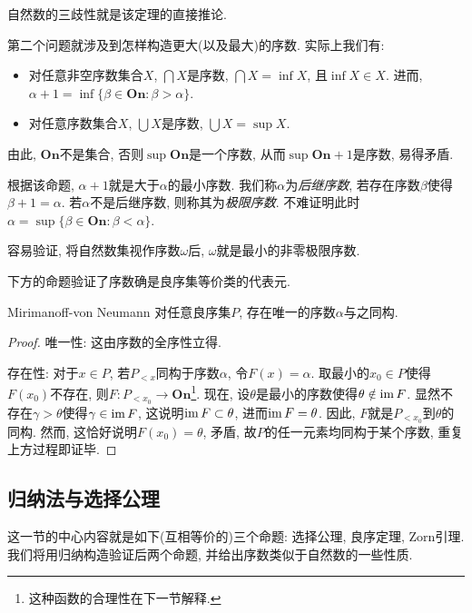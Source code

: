 自然数的三歧性就是该定理的直接推论. 

第二个问题就涉及到怎样构造更大(以及最大)的序数. 实际上我们有: 

\begin{proposition}{}
	\vspace{-2em}
	\begin{itemize}
		\item 对任意非空序数集合$X$, $\bigcap X$是序数, $\bigcap X = \inf X$, 且$\inf X \in X$. 进而, $\alpha +1 = \inf \{ \beta \in \mathbf{On} : \beta > \alpha \}$. 
		\item 对任意序数集合$X$, $\bigcup X$是序数, $\bigcup X = \sup X$. 
	\end{itemize}
\end{proposition}

由此, $\mathbf{On}$不是集合, 否则$\sup \mathbf{On}$是一个序数, 从而$\sup \mathbf{On} + 1$是序数, 易得矛盾. 

根据该命题, $\alpha +1$就是大于$\alpha$的最小序数. 我们称$\alpha$为\textit{后继序数}, 若存在序数$\beta$使得$\beta +1 =\alpha$. 若$\alpha$不是后继序数, 则称其为\textit{极限序数}. 不难证明此时$\alpha = \sup \{ \beta \in \mathbf{On} :\beta < \alpha \}$. 

容易验证, 将自然数集视作序数$\omega$后, $\omega$就是最小的非零极限序数. 

下方的命题验证了序数确是良序集等价类的代表元. 

\begin{proposition}{Mirimanoff-von Neumann}
	对任意良序集$P$, 存在唯一的序数$\alpha$与之同构. 
\end{proposition}
\begin{proof}
	唯一性: 这由序数的全序性立得. 
	
	存在性: 对于$x \in P$, 若$P_{<x}$同构于序数$\alpha$, 令$F(x)=\alpha$. 取最小的$x_0 \in P$使得$F(x_0)$不存在, 则$F:P_{<x_0} \to \mathbf{On}$\footnote{这种函数的合理性在下一节解释.}. 现在, 设$\theta$是最小的序数使得$\theta \notin \operatorname{im} F$. 显然不存在$\gamma >\theta$使得$\gamma \in \operatorname{im} F$, 这说明$\operatorname{im} F \subset \theta$, 进而$\operatorname{im} F = \theta$. 因此, $F$就是$P_{<x_0}$到$\theta$的同构. 然而, 这恰好说明$F(x_0)=\theta$, 矛盾, 故$P$的任一元素均同构于某个序数, 重复上方过程即证毕. 
\end{proof}

\subsection{归纳法与选择公理}

这一节的中心内容就是如下(互相等价的)三个命题: 选择公理, 良序定理, Zorn引理. 我们将用归纳构造验证后两个命题, 并给出序数类似于自然数的一些性质. 

